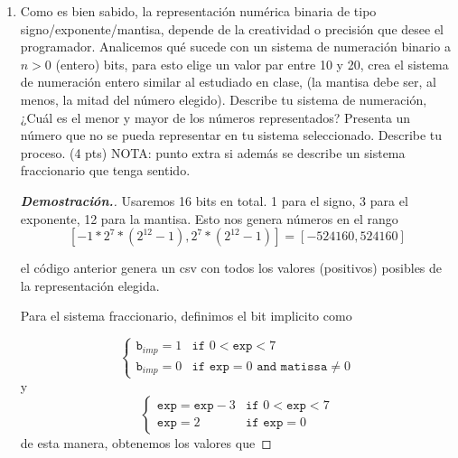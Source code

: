 \documentclass{article}
\begin{document}
\begin{enumerate}


	\item Como es bien sabido, la representaci\'on num\'erica binaria de tipo signo/exponente/mantisa, depende de la creatividad o precisi\'on que desee el programador. Analicemos qu\'e sucede con un sistema de numeraci\'on binario a $n>0$ (entero) bits, para esto elige un valor par entre 10 y 20, crea el sistema de numeraci\'on entero similar al estudiado en clase, (la mantisa debe ser, al menos, la mitad del n\'umero elegido). Describe tu sistema de numeraci\'on, ¿Cu\'al es el menor y mayor de los n\'umeros representados? Presenta un n\'umero que no se pueda representar en tu sistema seleccionado. Describe tu proceso. (4 pts) NOTA: punto extra si adem\'as se describe un sistema fraccionario que tenga sentido.
	      \begin{mdframed}[
			      linecolor=darkgray,
			      backgroundcolor=white]
		      \begin{proof}[\textbf{Demostraci\'on.}]
			      Usaremos 16 bits en total. 1 para el signo, 3 para el exponente, 12 para la mantisa. Esto nos genera n\'umeros en el rango
			      \[ [-1*2^7*(2^{12} - 1), 2^7*(2^{12} - 1)] = [-524160, 524160] \]

			      


			      el c\'odigo anterior genera un csv con todos los valores (positivos) posibles de la representaci\'on elegida.

			      Para el sistema fraccionario, definimos el bit implicito como

			      $$
				      \begin{cases}
					      \texttt{b}_{imp}= 1   & \texttt{if } 0 <\texttt{exp} < 7                           \\
					      \texttt{b}_{imp} =  0 & \texttt{if } \texttt{exp} = 0 \texttt{ and matissa} \neq 0
				      \end{cases}
			      $$
			      y
			      $$
				      \begin{cases}
					      \texttt{exp}=\texttt{exp}-3 & \texttt{if } 0 <\texttt{exp} < 7 \\
					      \texttt{exp} = 2            & \texttt{if } \texttt{exp} = 0
				      \end{cases}
			      $$
			      de esta manera, obtenemos los valores que

		      \end{proof}
	      \end{mdframed}


\end{enumerate}
\end{document}
